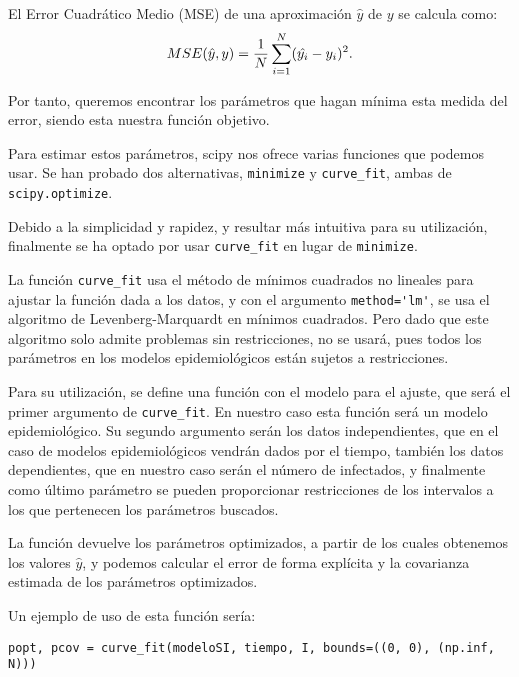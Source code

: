 \begin{definition}
El Error Cuadrático Medio (MSE) de una aproximación $\hat{y}$ de $y$ se calcula como:
$$MSE(\hat{y}, y)= {1\over N}\sum_{i=1}^N (\hat{y_i}-y_i)^2.$$
\end{definition}

Por tanto, queremos encontrar los parámetros que hagan mínima esta medida del error, siendo esta nuestra función objetivo.

Para estimar estos parámetros, scipy nos ofrece varias funciones que podemos usar. Se han probado dos alternativas, \verb|minimize| y \verb|curve_fit|, ambas de \verb|scipy.optimize|.

Debido a la simplicidad y rapidez, y resultar más intuitiva para su utilización, finalmente se ha optado por usar \verb|curve_fit| en lugar de \verb|minimize|.

La función \verb|curve_fit| usa el método de mínimos cuadrados no lineales para ajustar la función dada a los datos, y con el argumento \verb|method='lm'|, se usa el algoritmo de Levenberg-Marquardt en mínimos cuadrados. Pero dado que este algoritmo solo admite problemas sin restricciones, no se usará, pues todos los parámetros en los modelos epidemiológicos están sujetos a restricciones.

Para su utilización, se define una función con el modelo para el ajuste, que será el primer argumento de \verb|curve_fit|. En nuestro caso esta función será un modelo epidemiológico. Su segundo argumento serán los datos independientes, que en el caso de modelos epidemiológicos vendrán dados por el tiempo, también los datos dependientes, que en nuestro caso serán el número de infectados, y finalmente como último parámetro se pueden proporcionar restricciones de los intervalos a los que pertenecen los parámetros buscados.

La función devuelve los parámetros optimizados, a partir de los cuales obtenemos los valores $\hat{y}$, y podemos calcular el error de forma explícita y la covarianza estimada de los parámetros optimizados.

Un ejemplo de uso de esta función sería:

\begin{verbatim}
popt, pcov = curve_fit(modeloSI, tiempo, I, bounds=((0, 0), (np.inf, N)))
\end{verbatim}













